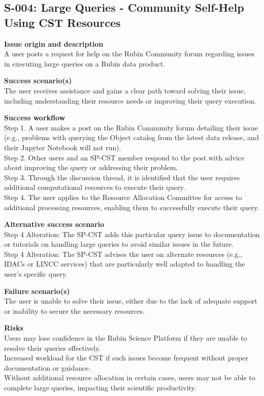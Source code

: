 \subsection{S-004: Large Queries - Community Self-Help Using CST Resources}

\textbf{Issue origin and description} \\
A user posts a request for help on the Rubin Community forum regarding issues in executing large queries on a Rubin data product.

\textbf{Success scenario(s)} \\
The user receives assistance and gains a clear path toward solving their issue, including understanding their resource needs or improving their query execution.

\textbf{Success workflow} \\
Step 1. A user makes a post on the Rubin Community forum detailing their issue (e.g., problems with querying the Object catalog from the latest data release, and their Jupyter Notebook will not run). \\
Step 2. Other users and an SP-CST member respond to the post with advice about improving the query or addressing their problem. \\
Step 3. Through the discussion thread, it is identified that the user requires additional computational resources to execute their query. \\
Step 4. The user applies to the Resource Allocation Committee for access to additional processing resources, enabling them to successfully execute their query.

\textbf{Alternative success scenario} \\
Step 4 Alteration: The SP-CST adds this particular query issue to documentation or tutorials on handling large queries to avoid similar issues in the future. \\
Step 4 Alteration: The SP-CST advises the user on alternate resources (e.g., IDACs or LINCC services) that are particularly well adapted to handling the user's specific query.

\textbf{Failure scenario(s)} \\
The user is unable to solve their issue, either due to the lack of adequate support or inability to secure the necessary resources.

\textbf{Risks} \\
Users may lose confidence in the Rubin Science Platform if they are unable to resolve their queries effectively. \\
Increased workload for the CST if such issues become frequent without proper documentation or guidance. \\
Without additional resource allocation in certain cases, users may not be able to complete large queries, impacting their scientific productivity.

